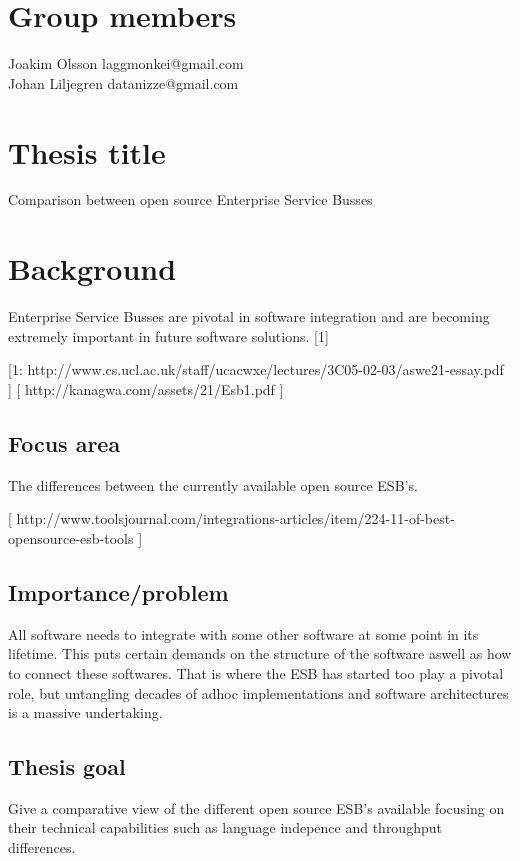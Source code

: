 \documentclass[11pt]{article} %
\begin{document}
\section{Group members}
Joakim Olsson laggmonkei@gmail.com \\
Johan Liljegren datanizze@gmail.com

\section{Thesis title}
Comparison between open source Enterprise Service Busses

\section{Background}
Enterprise Service Busses are pivotal in software integration and are becoming extremely important in future software solutions. [1]

[1:  http://www.cs.ucl.ac.uk/staff/ucacwxe/lectures/3C05-02-03/aswe21-essay.pdf ]
[ http://kanagwa.com/assets/21/Esb1.pdf ]






\subsection{Focus area}
The differences between the currently available open source ESB’s.

[ http://www.toolsjournal.com/integrations-articles/item/224-11-of-best-opensource-esb-tools ]

\subsection{Importance/problem}
All software needs to integrate with some other software at some point in its lifetime.
This puts certain demands on the structure of the software aswell as how to connect these
softwares. That is where the ESB has started too play a pivotal role, but untangling
decades of adhoc implementations and software architectures is a massive undertaking.

\subsection{Thesis goal}
Give a comparative view of the different open source ESB’s available focusing on their
technical capabilities such as language indepence and throughput differences.
\end{document}
